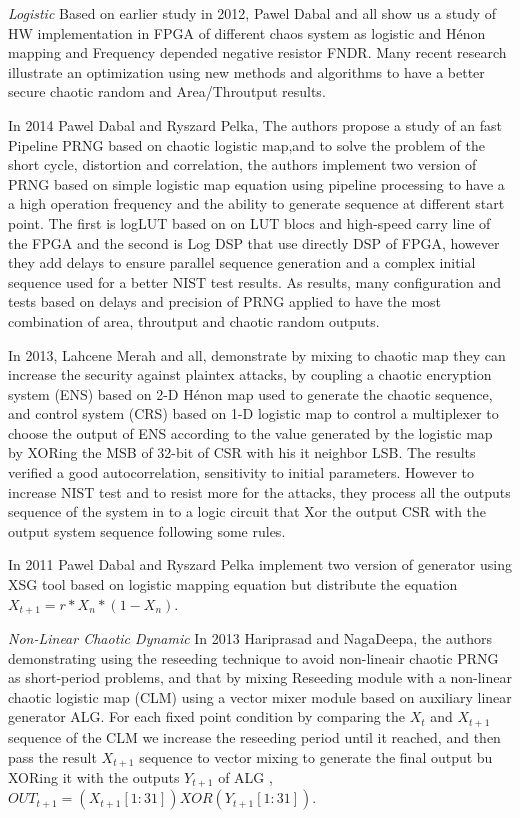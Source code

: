 \textit{Logistic} Based on earlier study in 2012, Pawel Dabal and all show us a study of HW implementation in FPGA of different chaos system as logistic and Hénon mapping and Frequency depended negative resistor FNDR. Many recent research illustrate an optimization using new methods and algorithms to have a better secure chaotic random and Area/Throutput results.

In 2014 Pawel Dabal and Ryszard Pelka, The authors propose a study of an fast Pipeline PRNG based on chaotic logistic map,and to solve the problem of the short cycle, distortion and correlation, the authors implement two version of PRNG based on simple logistic map equation using pipeline processing to have a a high operation frequency and the ability to generate sequence at different start point. The first is logLUT based on on LUT blocs and high-speed carry line of the FPGA and the second is Log DSP that use directly DSP of FPGA, however they add delays to ensure parallel sequence generation and a complex initial sequence used for a better NIST test results. As results, many configuration and tests based on delays and precision of PRNG applied to have the most combination of area, throutput and chaotic random outputs. 

In 2013, Lahcene Merah and all, demonstrate by mixing to chaotic map they can increase the security against plaintex attacks, by coupling a chaotic encryption system (ENS) based on 2-D Hénon map used to generate the chaotic sequence, and control system (CRS) based on 1-D logistic map to control a multiplexer to choose the output of ENS according to the value generated by the logistic map by XORing the MSB of 32-bit of CSR with his it neighbor LSB. The results verified a good autocorrelation, sensitivity to initial parameters. However to increase NIST test and to resist more for the attacks, they process all the outputs sequence of the system in to a logic circuit that Xor the output CSR with the output system sequence following some rules.

In 2011 Pawel Dabal and Ryszard Pelka implement two version of generator using XSG tool based on logistic mapping equation but distribute the equation $X_{t+1} = r*X_{n}*(1-X_{n})$.

\textit{Non-Linear Chaotic Dynamic} In 2013 Hariprasad and NagaDeepa, the authors demonstrating using the reseeding technique to avoid non-lineair chaotic PRNG as short-period problems, and that by mixing Reseeding module with a non-linear chaotic logistic map (CLM) using a vector mixer module based on auxiliary linear generator ALG. For each fixed point condition by comparing the $X_{t}$ and $X_{t+1}$ sequence of the CLM we increase the reseeding period until it reached, and then pass the result $X_{t+1}$ sequence to vector mixing to generate the final output bu XORing it with the outputs $Y_{t+1}$ of ALG , ${OUT_{t+1}={(X_{t+1}[1:31]) XOR (Y_{t+1}[1:31])}}$.

